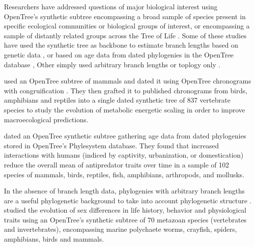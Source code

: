 \documentclass[oupdraft]{sysbio_sse}
\begin{document}
Researchers have addressed questions of major biological interest using OpenTree's
synthetic subtree encompassing a broad sample of species present
in specific ecological communities or biological groups of interest,
or encompassing a sample of distantly related groups across the Tree of Life
\citep{tarka2018sex, healy2019animal, herrera2015predicting, capdevila2020longevity, fisher2017evolution, boeckmann2015quest, uyeda2017evolution}.
Some of these studies have used the synthetic tree as backbone to estimate branch lengths
based on genetic data \citep{allen2019spatial, smith2018constructing}, or based on
age data from dated phylogenies in the OpenTree database \citep{uyeda2017evolution, geffroy2020evolutionary},
Other simply used arbitrary branch lengths \citep{healy2019animal, capdevila2020longevity}
or toplogy only \citep{boeckmann2015quest, fisher2017evolution, herrera2015predicting}.


\citep{uyeda2017evolution} used an OpenTree subtree of mammals and dated it using OpenTree
chronograms with congruification \citep{eastman2013congruification}. They then
grafted it to published chronograms from birds, amphibians
and reptiles into a single dated synthetic tree of 837 vertebrate species to study
the evolution of metabolic energetic scaling in order to improve macroecological predictions.

\citep{geffroy2020evolutionary} dated an OpenTree synthetic subtree gathering age data
from dated phylogenies stored in OpenTree's Phylesystem database. They found that
increased interactions with humans (indiced by captivity, urbanization, or domestication)
reduce the overall mean of antipredator traits over time in a sample of 102 species
of mammals, birds, reptiles, fish, amphibians, arthropods, and mollusks.


In the absence of branch length data, phylogenies with arbitrary branch lengths
are a useful phylogenetic background to take into account phylogenetic structure
\citep{garland1992procedures}.
\citep{tarka2018sex} studied the evolution of sex differences in life history, behavior
and physiological traits using an OpenTree's synthetic subtree of 70 metazoan species (vertebrates and invertebrates),
encompassing marine polychaete worms, crayfish, spiders, amphibians, birds and mammals.
\end{document}
